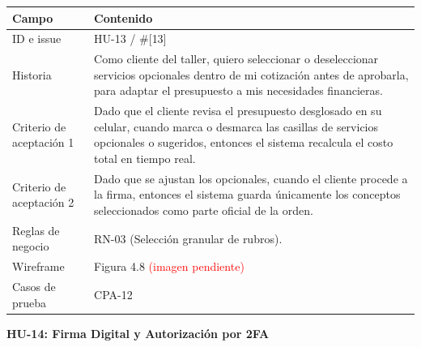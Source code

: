 {\def\LTcaptype{none} %
\begin{longtable}[]{@{}
  >{\raggedright\arraybackslash}p{}
  >{\raggedright\arraybackslash}p{}@{}}
\toprule\noalign{}
\begin{minipage}[b]{\linewidth}\raggedright
\textbf{Campo}
\end{minipage} & \begin{minipage}[b]{\linewidth}\raggedright
\textbf{Contenido}
\end{minipage} \\
\midrule\noalign{}
\endhead
\bottomrule\noalign{}
\endlastfoot
ID e issue & HU-13 / \#{[}13{]} \\
Historia & Como cliente del taller, quiero seleccionar o deseleccionar
servicios opcionales dentro de mi cotización antes de aprobarla, para
adaptar el presupuesto a mis necesidades financieras. \\
Criterio de aceptación 1 & Dado que el cliente revisa el presupuesto
desglosado en su celular, cuando marca o desmarca las casillas de
servicios opcionales o sugeridos, entonces el sistema recalcula el costo
total en tiempo real. \\
Criterio de aceptación 2 & Dado que se ajustan los opcionales, cuando el
cliente procede a la firma, entonces el sistema guarda únicamente los
conceptos seleccionados como parte oficial de la orden. \\
Reglas de negocio & RN-03 (Selección granular de rubros). \\
Wireframe & Figura 4.8 \textcolor{red}{(imagen pendiente)} \\
Casos de prueba & CPA-12 \\
\end{longtable}
}

\textbf{HU-14: Firma Digital y Autorización por 2FA}

